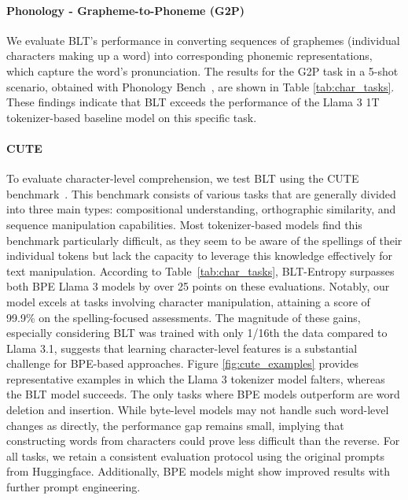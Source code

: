 \paragraph{Phonology - Grapheme-to-Phoneme (G2P)} We evaluate {\textsc BLT}'s performance in converting sequences of graphemes (individual characters making up a word) into corresponding phonemic representations, which capture the word's pronunciation. The results for the G2P task in a 5-shot scenario, obtained with Phonology Bench~\citep{suvarna2024phonologybench}, are shown in Table \ref{tab:char_tasks}. These findings indicate that {\textsc BLT} exceeds the performance of the Llama 3 1T tokenizer-based baseline model on this specific task.

\paragraph{CUTE}
To evaluate character-level comprehension, we test {\textsc BLT} using the CUTE benchmark~\citep{edman2024cute}. This benchmark consists of various tasks that are generally divided into three main types: compositional understanding, orthographic similarity, and sequence manipulation capabilities. Most tokenizer-based models find this benchmark particularly difficult, as they seem to be aware of the spellings of their individual tokens but lack the capacity to leverage this knowledge effectively for text manipulation. According to Table~\ref{tab:char_tasks}, {\textsc BLT}-Entropy surpasses both BPE Llama 3 models by over 25 points on these evaluations. Notably, our model excels at tasks involving character manipulation, attaining a score of 99.9\% on the spelling-focused assessments. The magnitude of these gains, especially considering {\textsc BLT} was trained with only 1/16th the data compared to Llama 3.1, suggests that learning character-level features is a substantial challenge for BPE-based approaches. Figure \ref{fig:cute_examples} provides representative examples in which the Llama 3 tokenizer model falters, whereas the {\textsc BLT} model succeeds. The only tasks where BPE models outperform are word deletion and insertion. While byte-level models may not handle such word-level changes as directly, the performance gap remains small, implying that constructing words from characters could prove less difficult than the reverse. For all tasks, we retain a consistent evaluation protocol using the original prompts from Huggingface. Additionally, BPE models might show improved results with further prompt engineering.

